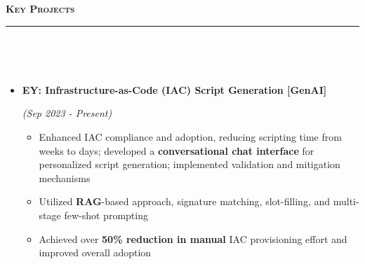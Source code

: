 \documentclass[a4paper,10pt]{article}
\newcommand{\isep}{-2 pt}
\newcommand{\lsep}{-0.5cm}
\newcommand{\resheading}[1]{{\small
        {
            \begin{minipage}
                {0.992\textwidth}\textbf{{\textsc{#1 \vphantom{p\^{E}} }}}
                \\[-0.3cm]
                \hrule
            \end{minipage}
            \\[-0.5cm]
        }
 }}
\begin{document}
\vspace{2pt}
\noindent
\resheading{\textbf{\large Key Projects}}\\[\lsep] 
\vspace{4pt}
\begin{itemize}
\item \textbf{EY: Infrastructure-as-Code (IAC) Script Generation [GenAI]}  \hfill {\emph{(Sep 2023 - Present)}\\[-0.6cm]
    \begin{itemize}\itemsep \isep
        \item Enhanced IAC compliance and adoption, reducing scripting time from weeks to days; developed a \textbf{conversational chat interface} for personalized script generation; implemented validation and mitigation mechanisms
        \item Utilized \textbf{RAG}-based approach, signature matching, slot-filling, and multi-stage few-shot prompting
        \item Achieved over \textbf{50\% reduction in manual} IAC provisioning effort and improved overall adoption
        
    
        

\end{itemize}}
\end{itemize}
\end{document}
